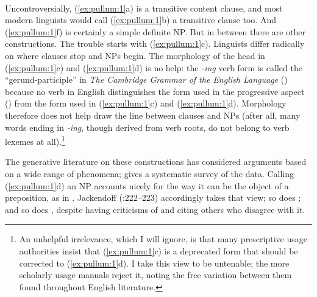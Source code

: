 \documentclass[output=paper,colorlinks,citecolor=brown
]{langscibook}
\begin{document}
\ea
\label{ex:pullum:1}
    \ea {} \\
    \ex {}  \\
    \ex {} \\
    \ex {} \\
    \ex {} \\
    \ex {} \\
    \z
\z
\noindent
Uncontroversially, (\ref{ex:pullum:1}a) is a transitive content clause, and most
modern linguists would call (\ref{ex:pullum:1}b) a transitive clause too.
And (\ref{ex:pullum:1}f) is certainly a simple definite NP. But in between there are
other constructions. The trouble starts with (\ref{ex:pullum:1}c). Linguists differ
radically on where clauses stop and NPs begin.
The morphology of the head in (\ref{ex:pullum:1}c) and (\ref{ex:pullum:1}d) is no help:
the \textit{-ing} verb form is called the ``gerund-participle'' in
\textit{The Cambridge Grammar of the English Language}
(\citealt{HuddPull02}) because no verb in English distinguishes the form
used in the progressive aspect () from the form used
in (\ref{ex:pullum:1}c) and (\ref{ex:pullum:1}d). Morphology therefore does not help draw the line
between clauses and NPs (after all, many words ending in
\mbox{\itshape-ing}, though derived from verb roots, do not belong
to verb lexemes at all).\footnote{%
   An unhelpful irrelevance, which I will ignore, is that many
   prescriptive usage authorities insist that (\ref{ex:pullum:1}c) is a deprecated
   form that should be corrected to (\ref{ex:pullum:1}d). I take this view to be
   untenable; the more scholarly usage manuals reject it, noting the
   free variation between them found throughout English literature.}

The generative literature on these constructions has considered
arguments based on a wide range of phenomena; \citet{Pullum91}
gives a systematic survey of the data. Calling (\ref{ex:pullum:1}d) an NP accounts
nicely for the way it can be the object of a preposition, as in
. Jackendoff
(\citeyear{Jackendoff77}:222--223) accordingly takes that view; so
does \citet{Pullum91}; and so does \citet{Blevins05}, despite having
criticisms of \citet{Pullum91} and citing others who disagree with it.
\end{document}
